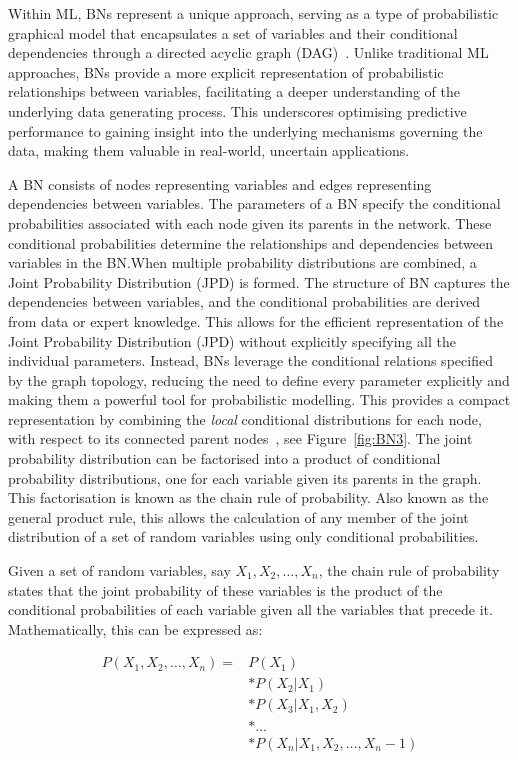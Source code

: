 \documentclass[journal]{IEEEtran}
\begin{document}
Within ML, BNs represent a unique approach, serving as a type of probabilistic graphical model that encapsulates a set of variables and their conditional dependencies through a directed acyclic graph (DAG)~\cite{Hand2001}. Unlike traditional ML approaches, BNs provide a more explicit representation of probabilistic relationships between variables, facilitating a deeper understanding of the underlying data generating process. This underscores optimising predictive performance to gaining insight into the underlying mechanisms governing the data, making them valuable in real-world, uncertain applications. 

A BN consists of nodes representing variables and edges representing dependencies between variables. The parameters of a BN specify the conditional probabilities associated with each node given its parents in the network. These conditional probabilities determine the relationships and dependencies between variables in the BN.\@ When multiple probability distributions are combined, a Joint Probability Distribution (JPD) is formed. The structure of BN captures the dependencies between variables, and the conditional probabilities are derived from data or expert knowledge. This allows for the efficient representation of the Joint Probability Distribution (JPD) without explicitly specifying all the individual parameters. Instead, BNs leverage the conditional relations specified by the graph topology, reducing the need to define every parameter explicitly and making them a powerful tool for probabilistic modelling. This provides a compact representation by combining the \textit{local} conditional distributions for each node, with respect to its connected parent nodes~\cite{Koller2009}, see Figure~\ref{fig:BN3}. The joint probability distribution can be factorised into a product of conditional probability distributions, one for each variable given its parents in the graph. This factorisation is known as the chain rule of probability. Also known as the general product rule, this allows the calculation of any member of the joint distribution of a set of random variables using only conditional probabilities.

Given a set of random variables, say $X_1, X_2, \ldots, X_n$, the chain rule of probability states that the joint probability of these variables is the product of the conditional probabilities of each variable given all the variables that precede it. Mathematically, this can be expressed as:

\begin{align}
    P(X_1, X_2, \ldots, X_n) = & P(X_1) \nonumber \\
    & * P(X_2 | X_1) \nonumber \\
    & * P(X_3 | X_1, X_2) \nonumber \\
    & * \ldots \nonumber \\
    & * P(X_n | X_1, X_2, \ldots, X_n-1)
    \label{eq:chain_rule}
\end{align}
    
\end{document}

